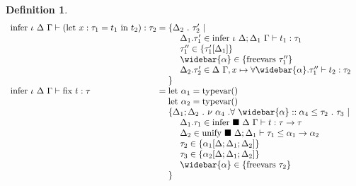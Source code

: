 \documentclass[manuscript]{acmart}
\theoremstyle{definition}
\newtheorem{definition}{Definition}[section]
\begin{document}
\begin{definition}
\[\begin{array}{l @{} l}
    \text{infer } \iota\ \Delta\ \Gamma \vdash 
    (\text{let}\ x : \tau_1 = t_1 \text{ in } t_2) : \tau_2
    &{} =
    \begin{array}[t]{@{} l}
      \{ \Delta_2\ .\ \tau_2' \ |\ 
      \\
      \ \ \ \ \Delta_1.\tau_1' \in \text{infer } \iota\ \Delta;\Delta_1\ \Gamma \vdash t_1 : \tau_1
      \\ 
      \ \ \ \ \tau_1'' \in \{\tau_1'[\Delta_1]\}
      \\ 
      \ \ \ \ \widebar{\alpha} \in \{\text{freevars}\ \tau_1''\}
      \\ 
      \ \ \ \ \Delta_2.\tau_2' \in \Delta\ \Gamma,x \mapsto \forall \widebar{\alpha} . \tau_1''
        \vdash t_2 : \tau_2 
      \\
      \} 
    \end{array}
    \\

    \text{infer } \iota\ \Delta\ \Gamma \vdash 
    \text{fix } t : \tau      
    &{} =
    \begin{array}[t]{@{} l}
      \text{let } \alpha_1 = \text{typevar}()
      \\
      \text{let } \alpha_2 = \text{typevar}()
      \\
      \{ \Delta_1;\Delta_2\ .\ \nu\ \alpha_4 \ . \forall\ \widebar{\alpha} ::
        \alpha_4 \leq \tau_2\ .\ \tau_3
        \ |\ 
      \\
      \ \ \ \ \Delta_1.\tau_1 \in
      \text{infer } \blacksquare\ \Delta\ \Gamma \vdash t : \tau \rightarrow \tau
      \\
      \ \ \ \ \Delta_2 \in \text{unify } \blacksquare\ \Delta;\Delta_1 \vdash 
      \tau_1 \leq \alpha_1 \rightarrow \alpha_2 
      \\
      \ \ \ \ \tau_2 \in \{\alpha_1[\Delta;\Delta_1;\Delta_2]\}
      \\ 
      \ \ \ \ \tau_3 \in \{\alpha_2[\Delta;\Delta_1;\Delta_2]\} 
      \\
      \ \ \ \ \widebar{\alpha} \in \{ \text{freevars}\ \tau_2 \}
      \\
      \} 
    \end{array}
  \end{array}
\]
\end{definition}
\end{document}
